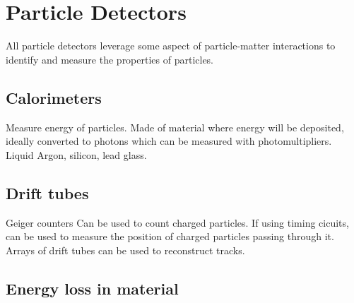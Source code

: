 \section{Particle Detectors}
All particle detectors leverage some aspect of particle-matter interactions to identify and measure the properties of particles.
\subsection{Calorimeters}
Measure energy of particles. Made of material where energy will be deposited, ideally converted to photons which can be measured with photomultipliers. Liquid Argon, silicon, lead glass.
\subsection{Drift tubes}
Geiger counters
Can be used to count charged particles. If using timing cicuits, can be used to measure the position of charged particles passing through it. Arrays of drift tubes can be used to reconstruct tracks.
\subsection{Energy loss in material}